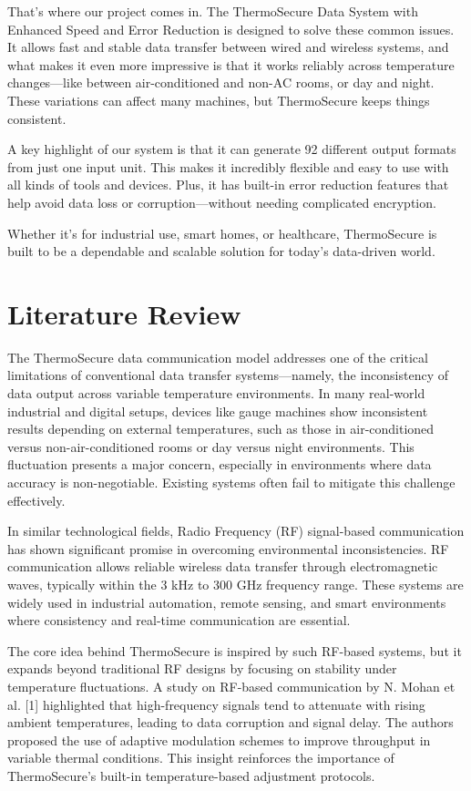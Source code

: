 \documentclass[12pt]{report}
\begin{document}
That's where our project comes in. The ThermoSecure Data System with Enhanced Speed and Error Reduction is designed to solve these common issues. It allows fast and stable data transfer between wired and wireless systems, and what makes it even more impressive is that it works reliably across temperature changes—like between air-conditioned and non-AC rooms, or day and night. These variations can affect many machines, but ThermoSecure keeps things consistent.

A key highlight of our system is that it can generate 92 different output formats from just one input unit. This makes it incredibly flexible and easy to use with all kinds of tools and devices. Plus, it has built-in error reduction features that help avoid data loss or corruption—without needing complicated encryption.

Whether it's for industrial use, smart homes, or healthcare, ThermoSecure is built to be a dependable and scalable solution for today's data-driven world.

\section{Literature Review}
The ThermoSecure data communication model addresses one of the critical limitations of conventional data transfer systems—namely, the inconsistency of data output across variable temperature environments. In many real-world industrial and digital setups, devices like gauge machines show inconsistent results depending on external temperatures, such as those in air-conditioned versus non-air-conditioned rooms or day versus night environments. This fluctuation presents a major concern, especially in environments where data accuracy is non-negotiable. Existing systems often fail to mitigate this challenge effectively.

In similar technological fields, Radio Frequency (RF) signal-based communication has shown significant promise in overcoming environmental inconsistencies. RF communication allows reliable wireless data transfer through electromagnetic waves, typically within the 3 kHz to 300 GHz frequency range. These systems are widely used in industrial automation, remote sensing, and smart environments where consistency and real-time communication are essential.

The core idea behind ThermoSecure is inspired by such RF-based systems, but it expands beyond traditional RF designs by focusing on stability under temperature fluctuations. A study on RF-based communication by N. Mohan et al. [1] highlighted that high-frequency signals tend to attenuate with rising ambient temperatures, leading to data corruption and signal delay. The authors proposed the use of adaptive modulation schemes to improve throughput in variable thermal conditions. This insight reinforces the importance of ThermoSecure's built-in temperature-based adjustment protocols.
\end{document}
